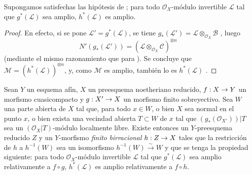 \documentclass[oneside,10pt]{amsart}
\makeatletter
\newcommand{\ega@arrow}[2]{\mathchoice{#1}{#2}{#2}{#2}}
\renewcommand{\to}{\ega@arrow{\longrightarrow}{\rightarrow}}
\let\EGAOriginalLabel\label
\renewcommand{\label}[1]{\phantomsection\EGAOriginalLabel{#1}}
\makeatother
\begin{document}
\begin{corollary}[6.6.10]
\label{II.6.6.10-fr}
Supongamos satisfechas las hipótesis de ;
para todo $\mathcal{O}_X$-módulo invertible $\mathcal{L}$ tal que $g^*(\mathcal{L})$ sea amplio, $h^*(\mathcal{L})$ es amplio.
\end{corollary}

\begin{proof}
En efecto, si se pone $\mathcal{L}'=g^*(\mathcal{L})$, se tiene
$g_*(\mathcal{L}')=\mathcal{L}\otimes_{\mathcal{O}_X}\mathcal{B}$
, luego
\[
N'(g_*(\mathcal{L}'))=
(\mathcal{L}\otimes_{\mathcal{O}_X}\mathcal{C})^{\otimes n}
\]
(mediante el mismo razonamiento que para ).
Se concluye que
$\mathcal{M}=(h^*(\mathcal{L}))^{\otimes n}$,
y, como $\mathcal{M}$ es amplio, también lo es $h^*(\mathcal{L})$ .
\end{proof}

\begin{proposition}[6.6.11]
\label{II.6.6.11-fr}
Sean $Y$ un esquema afín, $X$ un preesquema noetheriano reducido, $f:X\to Y$ un morfismo cuasicompacto y $g:X'\to X$ un morfismo finito sobreyectivo.
Sea $W$ una parte abierta de $X$ tal que, para todo $x\in W$, o bien $X$ sea normal en el punto $x$, o bien exista una vecindad abierta $T\subset W$ de $x$ tal que
$(g_*(\mathcal{O}_{X'}))|T$
sea un $(\mathcal{O}_X|T)$-módulo localmente libre.
Existe entonces un $Y$-preesquema reducido $Z$ y un $Y$-morfismo \emph{finito birracional} $h:Z\to X$ tales que la restricción de $h$ a $h^{-1}(W)$ sea un isomorfismo $h^{-1}(W)\xrightarrow{\sim}W$ y que se tenga la propiedad siguiente: para todo $\mathcal{O}_X$-módulo invertible $\mathcal{L}$ tal que $g^*(\mathcal{L})$ sea amplio relativamente a $f\circ g$, $h^*(\mathcal{L})$ es amplio relativamente a $f\circ h$.
\end{proposition}
\end{document}
